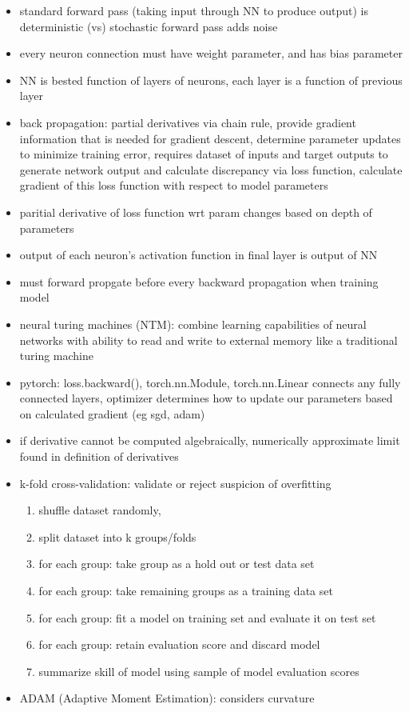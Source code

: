 \documentclass[10pt]{article}
\begin{document}
\begin{itemize}[label=\(\star\), leftmargin=1em, itemsep=-0.3em]
    \item standard forward pass (taking input through NN to produce output) is deterministic (vs) stochastic forward pass adds noise
    \item every neuron connection must have weight parameter, and has bias parameter
    \item NN is bested function of layers of neurons, each layer is a function of previous layer
    \item back propagation: partial derivatives via chain rule, provide gradient information that is needed for gradient descent, determine parameter updates to minimize training error, requires dataset of inputs and target outputs to generate network output and calculate discrepancy via loss function, calculate gradient of this loss function with respect to model parameters
    \item paritial derivative of loss function wrt param changes based on depth of parameters
    \item output of each neuron's activation function in final layer is output of NN
    \item must forward propgate before every backward propagation when training model
    \item neural turing machines (NTM): combine learning capabilities of neural networks with ability to read and write to external memory like a traditional turing machine
    \item pytorch: loss.backward(), torch.nn.Module, torch.nn.Linear connects any fully connected layers, optimizer determines how to update our parameters based on calculated gradient (eg sgd, adam)
    \item if derivative cannot be computed algebraically, numerically approximate limit found in definition of derivatives
    \item k-fold cross-validation: validate or reject suspicion of overfitting
          \begin{enumerate}[leftmargin=1em, itemsep=-0.3em]
              \item shuffle dataset randomly,
              \item split dataset into k groups/folds
              \item for each group: take group as a hold out or test data set
              \item for each group: take remaining groups as a training data set
              \item for each group: fit a model on training set and evaluate it on test set
              \item for each group: retain evaluation score and discard model
              \item summarize skill of model using sample of model evaluation scores
          \end{enumerate}
    \item ADAM (Adaptive Moment Estimation): considers curvature
\end{itemize}
\end{document}
